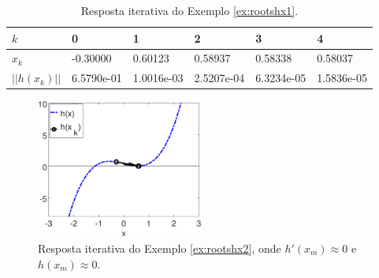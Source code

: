 \begin{table}[!h]
\centering
\begin{tabular}{|l|l|l|l|l|l|}
\hline
$k$      & 0 & 1 & 2 & 3 & 4 \\ \hline
$x_k$    & -0.30000 & 0.60123 & 0.58937 & 0.58338 & 0.58037 \\ \hline
$||h(x_k)||$ & 6.5790e-01 & 1.0016e-03 & 2.5207e-04 & 6.3234e-05 & 1.5836e-05 \\ \hline
\end{tabular}
\caption{Resposta iterativa do Exemplo \ref{ex:rootshx1}.}
\label{tab:rootsNcases3}
\end{table}

    \begin{figure}[!h]
        \centering
        \includegraphics[width=0.49\textwidth]{chapters/roots/mfiles/hx2/minimizando_hx_1.eps}
        \caption{Resposta iterativa do Exemplo \ref{ex:rootshx2}, onde $h'(x_m)\approx 0$ e $h(x_m)\approx 0$.}
        \label{fig:rootsNcasesc}
    \end{figure}

